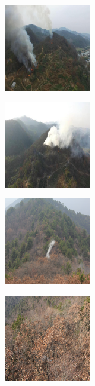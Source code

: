 \begin{figure}[ht]
    \centering
    \begin{subfigure}{.24\linewidth}
    \centering
        \includegraphics[width = 38mm]{figs/ain1.png}
    \end{subfigure}
    \begin{subfigure}{.24\linewidth}
    \centering
        \includegraphics[width = 38mm]{figs/ain2.png}
    \end{subfigure}
        \begin{subfigure}{.24\linewidth}
    \centering
        \includegraphics[width = 38mm]{figs/ain3.png}
    \end{subfigure}
    \begin{subfigure}{.24\linewidth}
    \centering
        \includegraphics[width = 38mm]{figs/ain4.png}
    \end{subfigure}
        \begin{subfigure}{.24\linewidth}
    \centering

\end{subfigure}
\end{figure}
